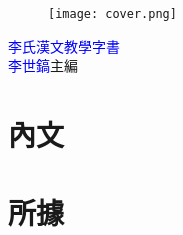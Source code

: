 \documentclass[a5paper,11pt]{book}
\begin{document}
\frontmatter
\linespread{1.25}
\begin{wrapfigure}{r}{50mm}
\texttt{[image: cover.png]}
\end{wrapfigure}
\hfill
\vfill
{\Huge\textcolor{blue}{李氏漢文教學字書}}\\
{\textcolor{blue}{李世鎬}\hspace{14pt}主編}
\vspace{64pt}
\newpage
\addtolength{\topmargin}{20mm}
\mainmatter
\linespread{1.25}


\chapter*{內文}
\begin{multicols}{3}

\end{multicols}
\chapter*{所據}

\end{document}
